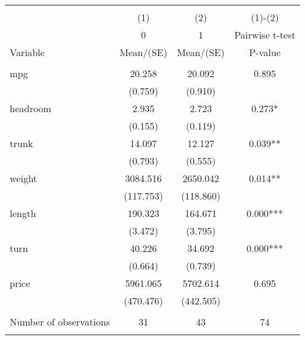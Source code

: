 
\begin{tabular}{@{\extracolsep{5pt}}lccc}
\\[-1.8ex]\hline \hline \\[-1.8ex]
 & \multicolumn{1}{c}{(1)}  & \multicolumn{1}{c}{(2)}  & \multicolumn{1}{c}{(1)-(2)} \\
 & \multicolumn{1}{c}{0}  & \multicolumn{1}{c}{1}  & \multicolumn{1}{c}{Pairwise t-test}  \\
Variable & Mean/(SE) & Mean/(SE) & P-value \\ \hline \\[-1.8ex] 
mpg   & 20.258    & 20.092    & 0.895   \\
 & (0.759)  & (0.910)  &  \\ [1ex]
headroom   & 2.935    & 2.723    & 0.273*   \\
 & (0.155)  & (0.119)  &  \\ [1ex]
trunk   & 14.097    & 12.127    & 0.039**   \\
 & (0.793)  & (0.555)  &  \\ [1ex]
weight   & 3084.516    & 2650.042    & 0.014**   \\
 & (117.753)  & (118.860)  &  \\ [1ex]
length   & 190.323    & 164.671    & 0.000***   \\
 & (3.472)  & (3.795)  &  \\ [1ex]
turn   & 40.226    & 34.692    & 0.000***   \\
 & (0.664)  & (0.739)  &  \\ [1ex]
price   & 5961.065    & 5702.614    & 0.695   \\
 & (470.476)  & (442.505)  &  \\ [1ex]
\hline \\[-1.8ex]
Number of observations  & 31   & 43  & 74  \\
\hline \hline \\[-1.8ex]

\end{tabular}
